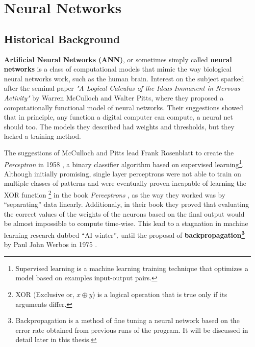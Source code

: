 \chapter{Neural Networks} \label{literature}



\section{Historical Background}

\textbf{Artificial Neural Networks (ANN)}, or sometimes simply called
\textbf{neural networks} is a class of computational models that mimic
the way biological neural networks work, such as the human brain. Interest
on the subject sparked after the seminal paper \textit{"A Logical
Calculus of the Ideas Immanent in Nervous Activity"}
\cite{article:McCulloch1943} by Warren McCulloch and Walter Pitts, where
they proposed a computationally functional model of neural networks.
Their suggestions showed that in principle, any function a digital computer
can compute, a neural net should too. The models they described had weights
and thresholds, but they lacked a training method. 

The suggestions of McCulloch and Pitts lead Frank Rosenblatt to create
the \textit{Perceptron} in 1958 \cite{article:Rosenblatt1958ThePA}, a
binary classifier algorithm based on supervised
learning\footnote{Supervised learning is a machine learning training
technique that optimizes a model based on examples input-output
pairs.}. Although initially promising, single layer perceptrons were
not able to train on multiple classes of patterns and were eventually
proven incapable of learning the XOR function \footnote{XOR (Exclusive
or, $x\oplus y$) is a logical operation that is true only if its
arguments differ.} in the book \textit{Perceptrons}
\cite{book:minsky1969perceptrons}, as the way they worked was by
``separating'' data linearly. Additionaly, in their book they proved
that evaluating the correct values of the weights of the neurons
based on the final output would be almost impossible to compute time-wise.
This lead to a stagnation in machine
learning research dubbed ``AI winter'', until the proposal of
\textbf{backpropagation\footnote{Backpropagation is a method of fine
tuning a neural network based on the error rate obtained from previous
runs of the program. It will be discussed in detail later in this
thesis.}} by Paul John Werbos in 1975 \cite{book:werbos1975beyond}.

